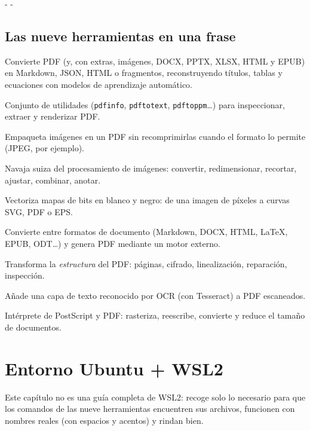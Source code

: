 \documentclass[11pt,a4paper]{article}
\makeatletter
\newcommand{\necesitaespacio}[1]{\par\penalty-100\begingroup
	\setlength{\dimen@}{#1}\dimen@ii\pagegoal\advance\dimen@ii-\pagetotal
	\ifdim\dimen@>\dimen@ii\ifdim\dimen@ii>\z@\vfil\fi\penalty-\@M\fi\endgroup}
\newcommand{\cmd}[1]{\texttt{\textcolor{colcmd}{#1}}}      %
\makeatother
\begin{document}
	\necesitaespacio{8\baselineskip}
	\subsection{Las nueve herramientas en una frase}
	
	\begin{description}[style=nextline, leftmargin=1.2em, font=\normalfont\bfseries\color{acento}]
		\item[Marker] Convierte PDF (y, con extras, imágenes, DOCX, PPTX, XLSX, HTML y EPUB) en Markdown, JSON, HTML o fragmentos, reconstruyendo títulos, tablas y ecuaciones con modelos de aprendizaje automático.
		\item[Poppler] Conjunto de utilidades (\cmd{pdfinfo}, \cmd{pdftotext}, \cmd{pdftoppm}\ldots) para inspeccionar, extraer y renderizar PDF.
		\item[img2pdf] Empaqueta imágenes en un PDF sin recomprimirlas cuando el formato lo permite (JPEG, por ejemplo).
		\item[ImageMagick] Navaja suiza del procesamiento de imágenes: convertir, redimensionar, recortar, ajustar, combinar, anotar.
		\item[Potrace] Vectoriza mapas de bits en blanco y negro: de una imagen de píxeles a curvas SVG, PDF o EPS.
		\item[Pandoc] Convierte entre formatos de documento (Markdown, DOCX, HTML, LaTeX, EPUB, ODT\ldots) y genera PDF mediante un motor externo.
		\item[QPDF] Transforma la \emph{estructura} del PDF: páginas, cifrado, linealización, reparación, inspección.
		\item[OCRmyPDF] Añade una capa de texto reconocido por OCR (con Tesseract) a PDF escaneados.
		\item[Ghostscript] Intérprete de PostScript y PDF: rasteriza, reescribe, convierte y reduce el tamaño de documentos.
	\end{description}
	
	\clearpage
	\section{Entorno Ubuntu + WSL2}\label{sec:wsl}
	
	Este capítulo no es una guía completa de WSL2: recoge solo lo necesario para que los comandos de las nueve herramientas encuentren sus archivos, funcionen con nombres reales (con espacios y acentos) y rindan bien.
	
\end{document}
